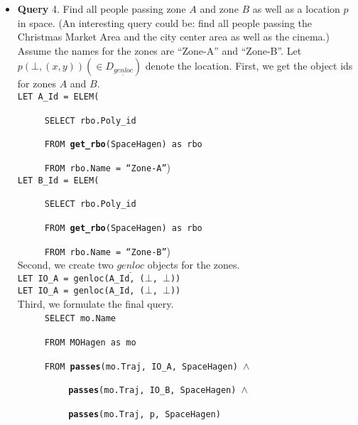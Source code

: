 \begin{itemize}
 \item \textbf{Query} 4. Find all people passing zone $A$ and zone $B$ as well as a location $p$ 
in space. (An interesting query could be: find all people passing the Christmas Market Area and the city center area as well as the cinema.) \\

Assume the names for the zones are ``Zone-A'' and ``Zone-B''. Let $p(\bot, (x,y))(\in D_{\underline{genloc}})$ denote the location. First, we get the object ids for zones $A$ and $B$. \\ 

\texttt{LET A\_Id = ELEM(}

$\hspace{1cm}$ \texttt{SELECT rbo.Poly\_id}

$\hspace{1cm}$ \texttt{FROM \textbf{get\_rbo}(SpaceHagen) as rbo}

$\hspace{1cm}$ \texttt{FROM rbo.Name = ``Zone-A''}) \\

\texttt{LET B\_Id = ELEM(} 

$\hspace{1cm}$ \texttt{SELECT rbo.Poly\_id}

$\hspace{1cm}$ \texttt{FROM \textbf{get\_rbo}(SpaceHagen) as rbo}

$\hspace{1cm}$ \texttt{FROM rbo.Name = ``Zone-B''}) \\

Second, we create two $\underline{genloc}$ objects for the zones. \\

\texttt{LET IO\_A = genloc(A\_Id, ($\bot$, $\bot$))} \\

\texttt{LET IO\_A = genloc(A\_Id, ($\bot$, $\bot$))} \\

Third, we formulate the final query. \\ 

$\hspace{1cm}$ \texttt{SELECT mo.Name}

$\hspace{1cm}$ \texttt{FROM MOHagen as mo}

$\hspace{1cm}$ \texttt{FROM \textbf{passes}(mo.Traj, IO\_A, SpaceHagen) $\wedge$}

$\hspace{2cm}$ \texttt{\textbf{passes}(mo.Traj, IO\_B, SpaceHagen)  $\wedge$}

$\hspace{2cm}$ \texttt{\textbf{passes}(mo.Traj, p, SpaceHagen)} \\

\end{itemize}


